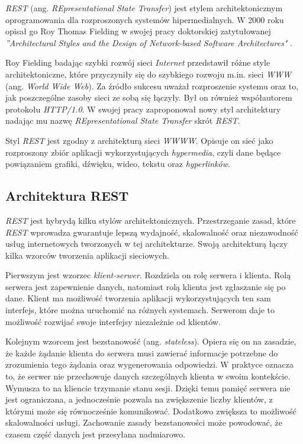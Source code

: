 \textsl{REST} (ang. \textsl{REpresentational State Transfer}) jest stylem architektonicznym oprogramowania dla rozproszonych systemów hipermedialnych. W 2000 roku opisał go Roy Thomas Fielding w swojej pracy doktorskiej zatytułowanej \textsl{''Architectural Styles and the Design of Network-based Software Architectures"} \cite{restinpractice}.

Roy Fielding badając  szybki rozwój sieci \textsl{Internet} przedstawił różne style architektoniczne, które przyczyniły się do szybkiego rozwoju m.in. sieci \textsl{WWW} (ang. \textsl{World Wide Web}). Za źródło sukcesu  uważał rozproszenie systemu oraz to, jak poszczególne zasoby sieci ze sobą się łączyły. Był on również współautorem protokołu \textsl{HTTP/1.0}. W swojej pracy zaproponował nowy styl architektury nadając mu nazwę \textsl{REpresentational State Transfer} skrót \textsl{REST}.  

Styl \textsl{REST} jest  zgodny z architekturą sieci \textsl{WWWW}. Opisuje on sieć jako rozproszony zbiór aplikacji wykorzystujących \textsl{hypermedia}, czyli dane będące powiązaniem grafiki, dźwięku, wideo, tekstu oraz \textsl{hyperlinków}. 

\subsection{Architektura REST}
\textsl{REST} jest hybrydą kilku stylów architektonicznych. Przestrzeganie zasad, które \textsl{REST} wprowadza gwarantuje lepszą wydajność, skalowalność oraz niezawodność usług internetowych tworzonych w tej architekturze. Swoją architekturą łączy kilka wzorców tworzenia aplikacji sieciowych. 

Pierwszym  jest wzorzec \textsl{klient-serwer}. Rozdziela on rolę serwera i klienta. Rolą serwera jest zapewnienie danych, natomiast rolą klienta jest zgłaszanie się po dane. Klient ma możliwość tworzenia aplikacji wykorzystujących ten sam interfejs, które można uruchomić na różnych systemach. Serwerom daje to możliwość rozwijać swoje interfejsy niezależnie od klientów. 

Kolejnym wzorcem jest bezstanowość (ang. \textsl{stateless}). Opiera się on na zasadzie, że każde żądanie klienta do serwera musi zawierać informacje potrzebne do zrozumienia tego żądania oraz wygenerowania odpowiedzi. W praktyce oznacza to, że serwer nie przechowuje danych szczególnych klienta w swoim kontekście. Wymusza to na kliencie trzymanie stanu sesji. Dzięki temu pamięć serwera nie jest ograniczana, a jednocześnie pozwala na zwiększenie liczby klientów, z którymi może się równocześnie komunikować. Dodatkowo zwiększa to możliwość skalowalności usługi. Zachowanie zasady bezstanowości może powodować, że czasem część danych jest przesyłana nadmiarowo.

